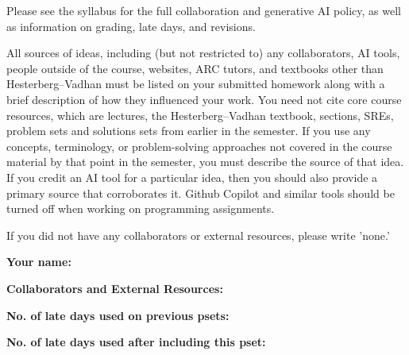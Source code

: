 \documentclass[11pt]{article}
\begin{document}

Please see the syllabus for the full collaboration and generative AI policy, as well as information on grading, late days, and revisions.

All sources of ideas, including (but not restricted to) any collaborators, AI tools, people outside of the course, websites, ARC tutors, and textbooks other than Hesterberg--Vadhan must be listed on your submitted homework along with a brief description of how they influenced your work. You need not cite core course resources, which are lectures, the Hesterberg--Vadhan textbook, sections, SREs, problem sets and solutions sets from earlier in the semester. If you use any concepts, terminology, or problem-solving approaches not covered in the course material by that point in the semester, you must describe the source of that idea. If you credit an AI tool for a particular idea, then you should also provide a primary source that corroborates it. Github Copilot and similar tools should be turned off when working on programming assignments.

If you did not have any collaborators or external resources, please write 'none.' 
\newline

\textbf{Your name: }

\textbf{Collaborators and External Resources:}

\textbf{No. of late days used on previous psets: }

\textbf{No. of late days used after including this pset: }

\vspace{1em}

\newpage
\end{document}
